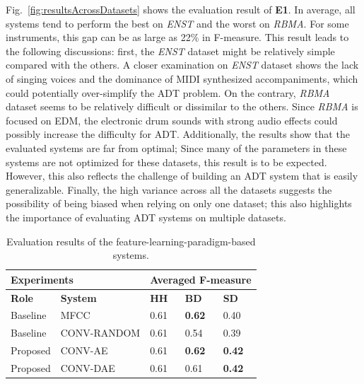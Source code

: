 \documentclass{article}
\begin{document}
Fig.~\ref{fig:resultsAcrossDatasets} shows the evaluation result of \textbf{E1}. In average, all systems tend to perform the best on \textit{ENST} and the worst on \textit{RBMA}. For some instruments, this gap can be as large as 22\% in F-measure. This result leads to the following discussions: first, the \textit{ENST} dataset might be relatively simple compared with the others. A closer examination on \textit{ENST} dataset shows the lack of singing voices and the dominance of MIDI synthesized accompaniments, which could potentially over-simplify the ADT problem. On the contrary, \textit{RBMA} dataset seems to be relatively difficult or dissimilar to the others. Since \textit{RBMA} is focused on EDM, the electronic drum sounds with strong audio effects could possibly increase the difficulty for ADT. Additionally, the results show that the evaluated systems are far from optimal; Since many of the parameters in these systems are not optimized for these datasets, this result is to be expected. However, this also reflects the challenge of building an ADT system that is easily generalizable. 
Finally, the high variance across all the datasets suggests the possibility of being biased when relying on only one dataset; this also highlights the importance of evaluating ADT systems on multiple datasets.   

\begin{table}[]
\centering
\begin{tabular}{lllll}
\hline
\multicolumn{2}{l}{\textbf{Experiments}}             & \multicolumn{3}{l}{\textbf{Averaged F-measure}} \\ \hline
\textbf{Role} & \multicolumn{1}{l|}{\textbf{System}} & \textbf{HH}   & \textbf{BD}    & \textbf{SD}    \\ \hline
Baseline      & \multicolumn{1}{l|}{MFCC}            & 0.61          & \textbf{0.62}  & 0.40           \\
Baseline      & \multicolumn{1}{l|}{CONV-RANDOM}    & 0.61          & 0.54           & 0.39           \\
Proposed      & \multicolumn{1}{l|}{CONV-AE}        & 0.61          & \textbf{0.62}  & \textbf{0.42}  \\
Proposed      & \multicolumn{1}{l|}{CONV-DAE}       & 0.61          & 0.61           & \textbf{0.42}  \\ \hline
\end{tabular}
\caption{Evaluation results of the feature-learning-paradigm-based systems.}
\label{tab:e2result}
\end{table}
\end{document}
